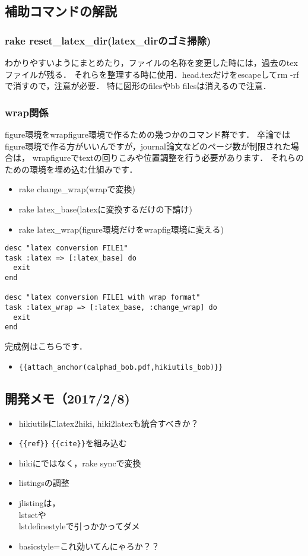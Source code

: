\subsection{補助コマンドの解説}
\subsubsection{rake reset\_latex\_dir(latex\_dirのゴミ掃除)}
わかりやすいようにまとめたり，ファイルの名称を変更した時には，過去のtexファイルが残る．
それらを整理する時に使用．head.texだけをescapeしてrm -rfで消すので，注意が必要．
特に図形のfilesやbb filesは消えるので注意．

\subsubsection{wrap関係}
figure環境をwrapfigure環境で作るための幾つかのコマンド群です．
卒論ではfigure環境で作る方がいいんですが，journal論文などのページ数が制限された場合は，
wrapfigureでtextの回りこみや位置調整を行う必要があります．
それらのための環境を埋め込む仕組みです．

\begin{itemize}
\item rake change\_wrap(wrapで変換)
\item rake latex\_base(latexに変換するだけの下請け)
\item rake latex\_wrap(figure環境だけをwrapfig環境に変える)
\end{itemize}\begin{lstlisting}[style=customRuby,basicstyle={\scriptsize\ttfamily}]
desc "latex conversion FILE1"
task :latex => [:latex_base] do
  exit
end

desc "latex conversion FILE1 with wrap format"
task :latex_wrap => [:latex_base, :change_wrap] do
  exit
end
\end{lstlisting}
完成例はこちらです．

\begin{itemize}
\item \verb|{{attach_anchor(calphad_bob.pdf,hikiutils_bob)}}|
\end{itemize}
\subsection{開発メモ（2017/2/8)}
\begin{itemize}
\item hikiutilsにlatex2hiki, hiki2latexも統合すべきか？
\item \verb|{{ref}}| \verb|{{cite}}|を組み込む
\item hikiにではなく，rake syncで変換
\item listingsの調整
\item jlistingは，\\lstsetや\\lstdefinestyleで引っかかってダメ
\item basicstyle={\small\ttfamily}これ効いてんにゃろか？？
\end{itemize}
